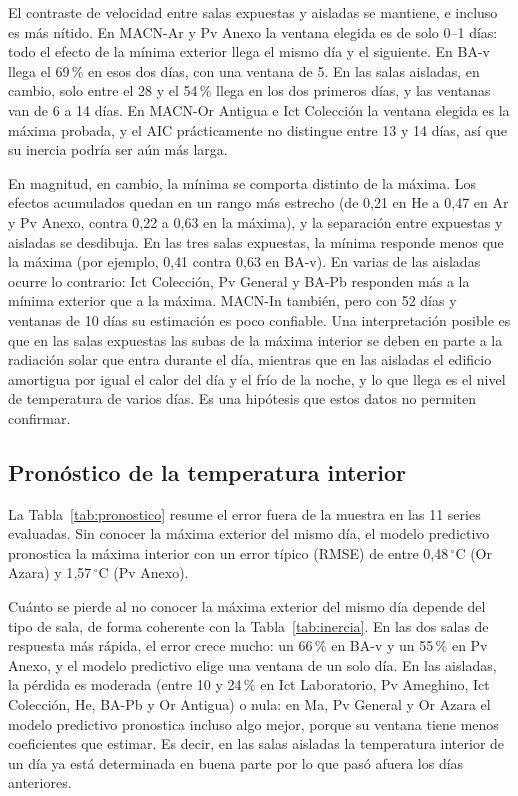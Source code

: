 \documentclass[11pt,a4paper]{article}
\begin{document}
El contraste de velocidad entre salas expuestas y aisladas se mantiene, e incluso es más nítido. En MACN-Ar y Pv Anexo la ventana elegida es de solo 0--1 días: todo el efecto de la mínima exterior llega el mismo día y el siguiente. En BA-v llega el 69\,\% en esos dos días, con una ventana de 5. En las salas aisladas, en cambio, solo entre el 28 y el 54\,\% llega en los dos primeros días, y las ventanas van de 6 a 14 días. En MACN-Or Antigua e Ict Colección la ventana elegida es la máxima probada, y el AIC prácticamente no distingue entre 13 y 14 días, así que su inercia podría ser aún más larga.

En magnitud, en cambio, la mínima se comporta distinto de la máxima. Los efectos acumulados quedan en un rango más estrecho (de 0{,}21 en He a 0{,}47 en Ar y Pv Anexo, contra 0{,}22 a 0{,}63 en la máxima), y la separación entre expuestas y aisladas se desdibuja. En las tres salas expuestas, la mínima responde menos que la máxima (por ejemplo, 0{,}41 contra 0{,}63 en BA-v). En varias de las aisladas ocurre lo contrario: Ict Colección, Pv General y BA-Pb responden más a la mínima exterior que a la máxima. MACN-In también, pero con 52 días y ventanas de 10 días su estimación es poco confiable. Una interpretación posible es que en las salas expuestas las subas de la máxima interior se deben en parte a la radiación solar que entra durante el día, mientras que en las aisladas el edificio amortigua por igual el calor del día y el frío de la noche, y lo que llega es el nivel de temperatura de varios días. Es una hipótesis que estos datos no permiten confirmar.

\subsection{Pronóstico de la temperatura interior}
\label{sec:pronostico}
La Tabla~\ref{tab:pronostico} resume el error fuera de la muestra en las 11 series evaluadas. Sin conocer la máxima exterior del mismo día, el modelo predictivo pronostica la máxima interior con un error típico (RMSE) de entre 0{,}48\,$^\circ$C (Or Azara) y 1{,}57\,$^\circ$C (Pv Anexo).

Cuánto se pierde al no conocer la máxima exterior del mismo día depende del tipo de sala, de forma coherente con la Tabla~\ref{tab:inercia}. En las dos salas de respuesta más rápida, el error crece mucho: un 66\,\% en BA-v y un 55\,\% en Pv Anexo, y el modelo predictivo elige una ventana de un solo día. En las aisladas, la pérdida es moderada (entre 10 y 24\,\% en Ict Laboratorio, Pv Ameghino, Ict Colección, He, BA-Pb y Or Antigua) o nula: en Ma, Pv General y Or Azara el modelo predictivo pronostica incluso algo mejor, porque su ventana tiene menos coeficientes que estimar. Es decir, en las salas aisladas la temperatura interior de un día ya está determinada en buena parte por lo que pasó afuera los días anteriores.
\end{document}
